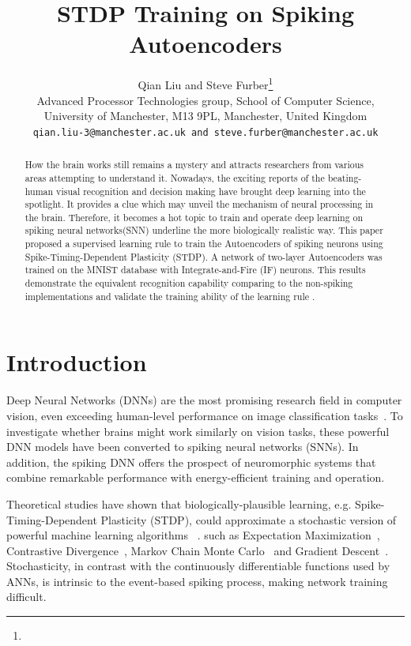 \documentclass{article}
\title{STDP Training on Spiking Autoencoders}
\author{
  Qian Liu and Steve Furber\thanks{} \\
  Advanced Processor Technologies group, School of Computer Science,\\
  University of Manchester, M13 9PL, Manchester, United Kingdom\\
  \texttt{qian.liu-3@manchester.ac.uk and steve.furber@manchester.ac.uk} \\
}
\begin{document}

\maketitle

\begin{abstract}
	How the brain works still remains a mystery and attracts researchers from various areas attempting to understand it.
	Nowadays, the exciting reports of the beating-human visual recognition and decision making have brought deep learning into the spotlight.
	It provides a clue which may unveil the mechanism of neural processing in the brain.
	Therefore, it becomes a hot topic to train and operate deep learning on spiking neural networks(SNN) underline the more biologically realistic way.
	This paper proposed a supervised learning rule to train the Autoencoders of spiking neurons using Spike-Timing-Dependent Plasticity (STDP).
	A network of two-layer Autoencoders was trained on the MNIST database with Integrate-and-Fire (IF) neurons.
	This results demonstrate the equivalent recognition capability comparing to the non-spiking implementations and validate the training ability of the learning rule .
	
\end{abstract}

\section{Introduction}
% 
Deep Neural Networks (DNNs) are the most promising research field in computer vision, even exceeding human-level performance on image classification tasks~\cite{he2015delving}.
To investigate whether brains might work similarly on vision tasks, these powerful DNN models have been converted to spiking neural networks (SNNs).
In addition, the spiking DNN offers the prospect of neuromorphic systems that combine remarkable performance with energy-efficient training and operation.

Theoretical studies have shown that biologically-plausible learning, e.g. Spike-Timing-Dependent Plasticity (STDP), could approximate a stochastic version of powerful machine learning algorithms	~\cite{nessler2013bayesian,neftci2013event,neftci2013event,o2016deep}.
such as Expectation Maximization~\cite{nessler2013bayesian}, 
Contrastive Divergence~\cite{neftci2013event}, Markov Chain Monte Carlo~\cite{buesing2011neural} and Gradient Descent~\cite{o2016deep}.
Stochasticity, in contrast with the continuously differentiable functions used by ANNs, is intrinsic to the event-based spiking process, making network training difficult.
\end{document}
